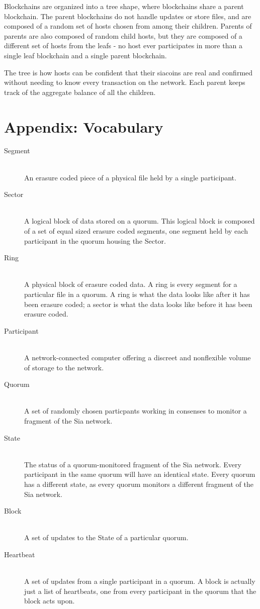 \documentclass[twocolumn]{article}
\begin{document}
Blockchains are organized into a tree shape, where \childrenperparent{} blockchains share a parent blockchain.
The parent blockchains do not handle updates or store files, and are composed of a random set of hosts chosen from among their children.
Parents of parents are also composed of random child hosts, but they are composed of a different set of hosts from the leafs - no host ever participates in more than a single leaf blockchain and a single parent blockchain.

The tree is how hosts can be confident that their siacoins are real and confirmed without needing to know every transaction on the network.
Each parent keeps track of the aggregate balance of all the children.

\section{Appendix: Vocabulary}

\begin{description}
	\item[Segment] \hfill \\
	An erasure coded piece of a physical file held by a single participant.
	\item[Sector] \hfill \\
	A logical block of data stored on a quorum.
	This logical block is composed of a set of equal sized erasure coded segments, one segment held by each participant in the quorum housing the Sector.
	\item[Ring] \hfill \\
	A physical block of erasure coded data.
	A ring is every segment for a particular file in a quorum.
	A ring is what the data looks like after it has been erasure coded; a sector is what the data looks like before it has been erasure coded.
	
	\item[Participant] \hfill \\
	A network-connected computer offering a discreet and nonflexible volume of storage to the network.
	\item[Quorum] \hfill \\
	A set of randomly chosen particpants working in consenses to monitor a fragment of the Sia network.
	\item[State] \hfill \\
	The status of a quorum-monitored fragment of the Sia network.
	Every participant in the same quorum will have an identical state.
	Every quorum has a different state, as every quorum monitors a different fragment of the Sia network.

	\item[Block] \hfill \\
	A set of updates to the State of a particular quorum.
	\item[Heartbeat] \hfill \\
	A set of updates from a single participant in a quorum.
	A block is actually just a list of heartbeats, one from every participant in the quorum that the block acts upon.
\end{description}
\end{document}
